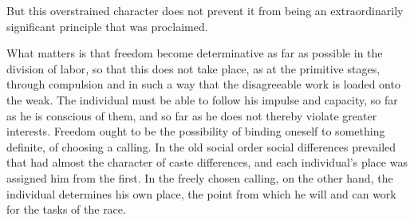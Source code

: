 \documentclass[12pt,a4paper,openany]{book}
\newcommand{\opage}[1]{\marginnote{\footnotesize\textit{[#1]}}}
\begin{document}
But this overstrained character does not prevent it from being an extraordinarily significant principle that was
proclaimed.

\opage{355}What matters is that freedom become determinative as far as possible in the division of labor, so that this
does not take place, as at the primitive stages, through compulsion and in such a way that the disagreeable work is loaded
onto the weak. The individual must be able to follow his impulse and capacity, so far as he is conscious of them, and so
far as he does not thereby violate greater interests. Freedom ought to be the possibility of binding oneself to something
definite, of choosing a calling. In the old social order social differences prevailed that had almost the character of
caste differences, and each individual's place was assigned him from the first. In the freely chosen calling, on the
other hand, the individual determines his own place, the point from which he will and can work for the tasks of the race.
\end{document}
